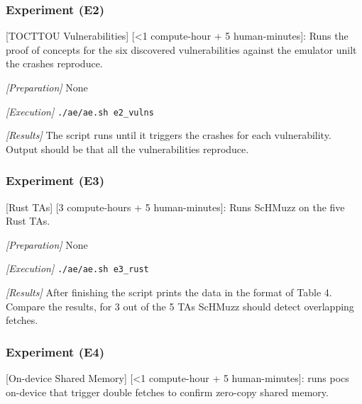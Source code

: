 \documentclass[conference]{IEEEtran}
\begin{document}
\subsubsection{Experiment (E2)}
[TOCTTOU Vulnerabilities] [\textless1 compute-hour + 5 human-minutes]: Runs the proof of concepts for the six discovered vulnerabilities against the emulator unilt the crashes reproduce.


\textit{[Preparation]}
None

\textit{[Execution]}
\small
\texttt{./ae/ae.sh e2\_vulns}
\normalsize

\textit{[Results]}
The script runs until it triggers the crashes for each vulnerability. Output should be that all the vulnerabilities reproduce.

\subsubsection{Experiment (E3)}
[Rust TAs] [3 compute-hours + 5 human-minutes]: Runs ScHMuzz on the five Rust TAs.


\textit{[Preparation]}
None

\textit{[Execution]}
\small
\texttt{./ae/ae.sh e3\_rust}
\normalsize

\textit{[Results]}
After finishing the script prints the data in the format of Table 4. Compare the results, for 3 out of the 5 TAs ScHMuzz should detect overlapping fetches.

\subsubsection{Experiment (E4)}
[On-device Shared Memory] [\textless1 compute-hour + 5 human-minutes]: runs pocs on-device that trigger double fetches to confirm zero-copy shared memory.
\end{document}

